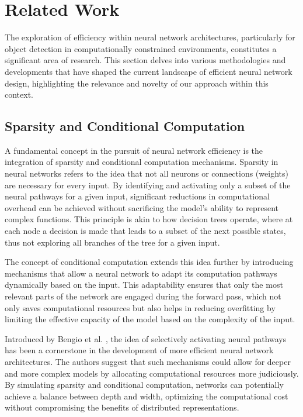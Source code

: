 \section{Related Work}  

The exploration of efficiency within neural network architectures, particularly for object detection in computationally constrained environments, constitutes a significant area of research. This section delves into various methodologies and developments that have shaped the current landscape of efficient neural network design, highlighting the relevance and novelty of our approach within this context.

\subsection{Sparsity and Conditional Computation}

A fundamental concept in the pursuit of neural network efficiency is the integration of sparsity and conditional computation mechanisms. Sparsity in neural networks refers to the idea that not all neurons or connections (weights) are necessary for every input. By identifying and activating only a subset of the neural pathways for a given input, significant reductions in computational overhead can be achieved without sacrificing the model's ability to represent complex functions. This principle is akin to how decision trees operate, where at each node a decision is made that leads to a subset of the next possible states, thus not exploring all branches of the tree for a given input.

The concept of conditional computation extends this idea further by introducing mechanisms that allow a neural network to adapt its computation pathways dynamically based on the input. This adaptability ensures that only the most relevant parts of the network are engaged during the forward pass, which not only saves computational resources but also helps in reducing overfitting by limiting the effective capacity of the model based on the complexity of the input.

Introduced by Bengio et al. \cite{bengio2013deep}, the idea of selectively activating neural pathways has been a cornerstone in the development of more efficient neural network architectures. The authors suggest that such mechanisms could allow for deeper and more complex models by allocating computational resources more judiciously. By simulating sparsity and conditional computation, networks can potentially achieve a balance between depth and width, optimizing the computational cost without compromising the benefits of distributed representations.

